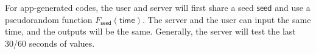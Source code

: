 For app-generated codes, the user and server will first share a seed $\mathsf{seed}$ and use a pseudorandom function $F_\mathsf{seed}(\mathsf{time})$. The server and the user can input the same time, and the outputs will be the same. Generally, the server will test the last 30/60 seconds of values.














